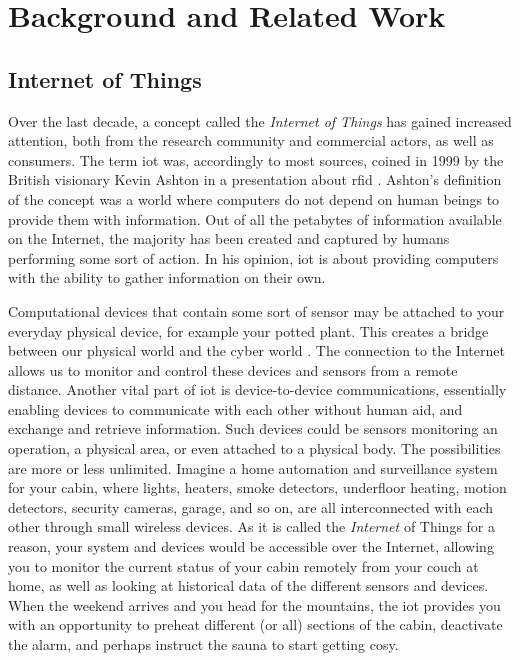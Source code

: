 \chapter{Background and Related Work}
\label{chp:background}

\section{Internet of Things}
\label{sec:iot}

Over the last decade, a concept called the \emph{Internet of Things} has gained increased attention, both from the research community and commercial actors, as well as consumers. The term \gls{iot} was, accordingly to most sources, coined in 1999 by the British visionary Kevin Ashton in a presentation about \gls{rfid} \cite{iot-phrase-2, iot-phrase-1}. Ashton's definition of the concept was a world where computers do not depend on human beings to provide them with information. Out of all the petabytes of information available on the Internet, the majority has been created and captured by humans performing some sort of action. In his opinion, \gls{iot} is about providing computers with the ability to gather information on their own.

Computational devices that contain some sort of sensor may be attached to your everyday physical device, for example your potted plant. This creates a bridge between our physical world and the cyber world \cite{Kopetz2011}. The connection to the Internet allows us to monitor and control these devices and sensors from a remote distance. Another vital part of \gls{iot} is device-to-device communications, essentially enabling devices to communicate with each other without human aid, and exchange and retrieve information. Such devices could be sensors monitoring an operation, a physical area, or even attached to a physical body. The possibilities are more or less unlimited. Imagine a home automation and surveillance system for your cabin, where lights, heaters, smoke detectors, underfloor heating, motion detectors, security cameras, garage, and so on, are all interconnected with each other through small wireless devices. As it is called the \emph{Internet} of Things for a reason, your system and devices would be accessible over the Internet, allowing you to monitor the current status of your cabin remotely from your couch at home, as well as looking at historical data of the different sensors and devices. When the weekend arrives and you head for the mountains, the \gls{iot} provides you with an opportunity to preheat different (or all) sections of the cabin, deactivate the alarm, and perhaps instruct the sauna to start getting cosy. 


